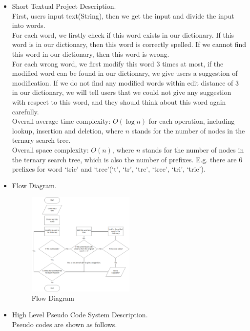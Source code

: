 %
%
\begin{itemize} 
\item{  Short Textual Project Description. } \\
First, users input text(String), then we get the input and divide the input into words. \\
For each word, we firstly check if this word exists in our dictionary. If this word is in our dictionary, then this word is correctly spelled. If we cannot find this word in our dictionary, then this word is wrong. \\
For each wrong word, we first modify this word 3 times at most, if the modified word can be found in our dictionary, we give users a suggestion of modification. If we do not find any modified words within edit distance of 3 in our dictionary, we will tell users that we could not give any suggestion with respect to this word, and they should think about this word again carefully. \\
Overall average time complexity: $ O(\log n) $ for each operation, including lookup, insertion and deletion, where $ n $ stands for the number of nodes in the ternary search tree. \\
Overall space complexity: $ O(n) $, where $ n $ stands for the number of nodes in the ternary search tree, which is also the number of prefixes. 
E.g. there are 6 prefixes for word `trie' and `tree'(`t', `tr', `tre', `tree', `tri', `trie'). \\


\item{ Flow Diagram. }
\begin{figure}[H]
	\centering
	\includegraphics[width=0.5\textwidth]{fig/flow-diagram.png}
	\caption{Flow Diagram}
	\label{fig:flow-diagram}
\end{figure}
\item{ High Level Pseudo Code System Description. } \\
Pseudo codes are shown as follows.


\end{itemize}
